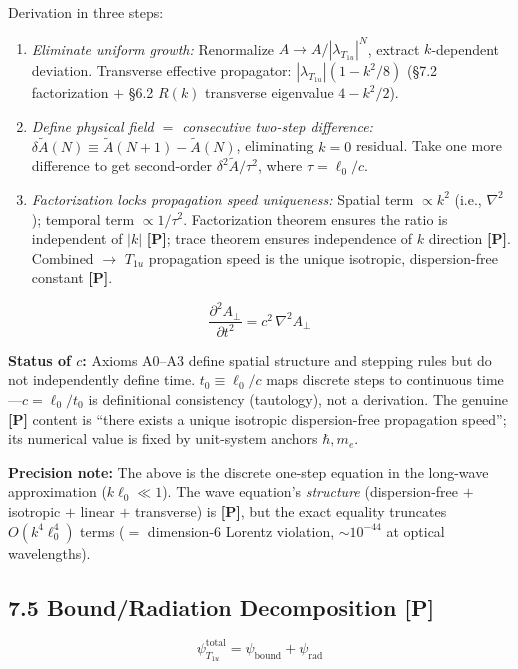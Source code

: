 \documentclass[11pt,a4paper]{article}
\newcommand{\gradeP}{\textbf{[P]}}
\begin{document}
Derivation in three steps:
\begin{enumerate}[nosep]
\item \emph{Eliminate uniform growth:} Renormalize $A\to A/|\lambda_{T_{1u}}|^N$, extract $k$-dependent deviation. Transverse effective propagator: $|\lambda_{T_{1u}}|(1-k^2/8)$ (\S7.2 factorization $+$ \S6.2 $R(k)$ transverse eigenvalue $4-k^2/2$).
\item \emph{Define physical field $=$ consecutive two-step difference:} $\delta\tilde{A}(N)\equiv\tilde{A}(N{+}1)-\tilde{A}(N)$, eliminating $k=0$ residual. Take one more difference to get second-order $\delta^2\tilde{A}/\tau^2$, where $\tau=\ell_0/c$.
\item \emph{Factorization locks propagation speed uniqueness:} Spatial term $\propto k^2$ (i.e., $\nabla^2$); temporal term $\propto 1/\tau^2$. Factorization theorem ensures the ratio is independent of $|k|$ \gradeP; trace theorem ensures independence of $k$ direction \gradeP. Combined $\to$ $T_{1u}$ propagation speed is the unique isotropic, dispersion-free constant \gradeP.
\end{enumerate}

\begin{equation}
\boxed{\frac{\partial^2 A_\perp}{\partial t^2} = c^2\,\nabla^2 A_\perp}
\end{equation}

\textbf{Status of $c$:} Axioms A0--A3 define spatial structure and stepping rules but do not independently define time. $t_0\equiv\ell_0/c$ maps discrete steps to continuous time---$c=\ell_0/t_0$ is definitional consistency (tautology), not a derivation. The genuine \gradeP{} content is ``there exists a unique isotropic dispersion-free propagation speed''; its numerical value is fixed by unit-system anchors $\hbar, m_e$.

\textbf{Precision note:} The above is the discrete one-step equation in the long-wave approximation ($k\ell_0\ll 1$). The wave equation's \emph{structure} (dispersion-free $+$ isotropic $+$ linear $+$ transverse) is \gradeP, but the exact equality truncates $O(k^4\ell_0^4)$ terms ($=$ dimension-6 Lorentz violation, $\sim 10^{-44}$ at optical wavelengths).

\subsection{7.5 Bound/Radiation Decomposition \gradeP}

\begin{equation}
\psi_{T_{1u}}^{\mathrm{total}} = \psi_{\mathrm{bound}} + \psi_{\mathrm{rad}}
\end{equation}
\end{document}
